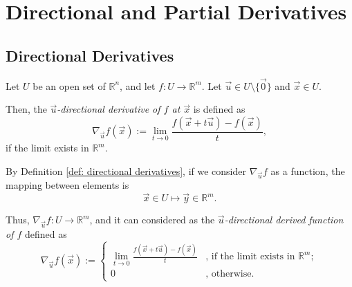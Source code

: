 
\chapter{Directional and Partial Derivatives}



\section{Directional Derivatives}


\begin{definition}
	\label{def: directional derivatives}
	Let $U$ be an open set of $\mathbb R^n$, and let $f: U \to \mathbb R^m$. Let $\vec u \in U \setminus \{\vec 0\}$ and $\vec x \in U$.
	
	Then, the \textit{$\vec u$-directional derivative of $f$ at $\vec x$} is defined as
	$$
	\nabla_{\vec u} f(\vec x) := \lim_{t \to 0} \frac{f(\vec x + t \vec u) - f(\vec x)}{t},
	$$
	if the limit exists in $\mathbb R^m$.
\end{definition}



\begin{note}
	By Definition \ref{def: directional derivatives}, if we consider $\nabla_{\vec u} f$ as a function, the mapping between elements is
	$$
	\vec x \in U \mapsto \vec y \in \mathbb R^m.
	$$
	
	Thus, $\nabla_{\vec u} f: U \to \mathbb R^m$, and it can considered as the \textit{$\vec u$-directional derived function of $f$} defined as
	$$
	\nabla_{\vec u} f(\vec x) :=
	\begin{cases}
		\displaystyle \lim_{t \to 0} \frac{f(\vec x + t \vec u) - f(\vec x)}{t} & \text{, if the limit exists in $\mathbb R^m$}; \\
		0 & \text{, otherwise}.
	\end{cases}
	$$
\end{note}



